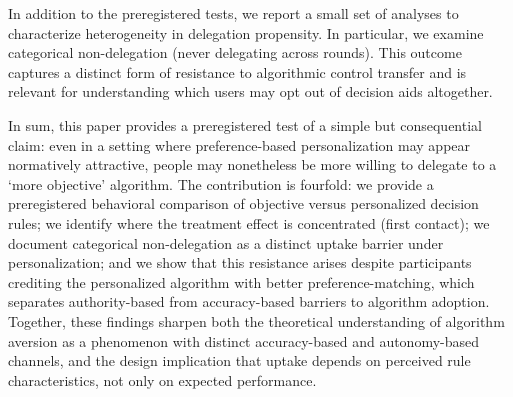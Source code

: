 \documentclass[a4paper, 12pt, fleqn]{article}
\theoremstyle{definition}
\begin{document}
In addition to the preregistered tests, we report a small set of analyses to characterize heterogeneity in delegation propensity. In particular, we examine categorical non-delegation (never delegating across rounds). This outcome captures a distinct form of resistance to algorithmic control transfer and is relevant for understanding which users may opt out of decision aids altogether.

In sum, this paper provides a preregistered test of a simple but consequential claim: even in a setting where preference-based personalization may appear normatively attractive, people may nonetheless be more willing to delegate to a `more objective' algorithm. The contribution is fourfold: we provide a preregistered behavioral comparison of objective versus personalized decision rules; we identify where the treatment effect is concentrated (first contact); we document categorical non-delegation as a distinct uptake barrier under personalization; and we show that this resistance arises despite participants crediting the personalized algorithm with better preference-matching, which separates authority-based from accuracy-based barriers to algorithm adoption. Together, these findings sharpen both the theoretical understanding of algorithm aversion as a phenomenon with distinct accuracy-based and autonomy-based channels, and the design implication that uptake depends on perceived rule characteristics, not only on expected performance.
\end{document}
